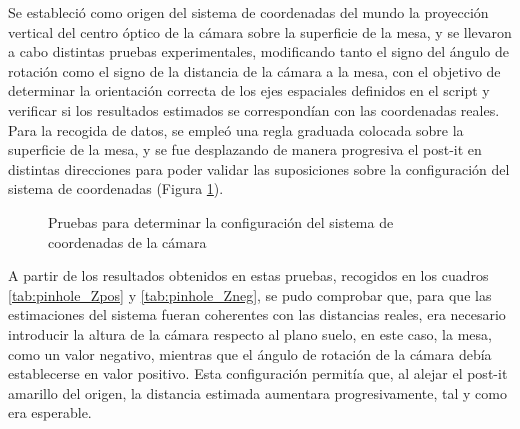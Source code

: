 Se estableció como origen del sistema de coordenadas del mundo la proyección vertical del centro óptico de la cámara sobre la superficie de la mesa, y se llevaron a cabo distintas pruebas experimentales, modificando tanto el signo del ángulo de rotación como el signo de la distancia de la cámara a la mesa, con el objetivo de determinar la orientación correcta de los ejes espaciales definidos en el script y verificar si los resultados estimados se correspondían con las coordenadas reales. Para la recogida de datos, se empleó una regla graduada colocada sobre la superficie de la mesa, y se fue desplazando de manera progresiva el post-it en distintas direcciones para poder validar las suposiciones sobre la configuración del sistema de coordenadas (Figura \ref{fig:prueba_ejes_camara}).

 \begin{figure}[H]
    \begin{center}
      \subcapcentertrue
      \hspace{2mm}
    \end{center}
    \caption{Pruebas para determinar la configuración del sistema de coordenadas de la cámara}
    \label{fig:prueba_ejes_camara}
  \end{figure}
  
A partir de los resultados obtenidos en estas pruebas, recogidos en los cuadros \ref{tab:pinhole_Zpos} y \ref{tab:pinhole_Zneg}, se pudo comprobar que, para que las estimaciones del sistema fueran coherentes con las distancias reales, era necesario introducir la altura de la cámara respecto al plano suelo, en este caso, la mesa, como un valor negativo, mientras que el ángulo de rotación de la cámara debía establecerse en valor positivo. Esta configuración permitía que, al alejar el post-it amarillo del origen, la distancia estimada aumentara progresivamente, tal y como era esperable. 
  
